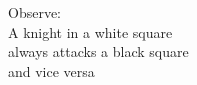 \documentclass[preview]{standalone}
\begin{document}
\begin{center}
Observe: \\ A knight in a white square \\ always attacks a black square \\ and vice versa
\end{center}
\end{document}
